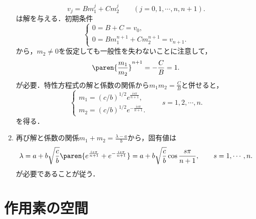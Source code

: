 \documentclass[uplatex, dvipdfmx]{jsreport}
\begin{document}
\begin{Proof}
\begin{enumerate}[{Step}1]
        \[v_j=Bm_1^j+Cm_2^j\qquad(j=0,1,\cdots,n,n+1).\]
        は解を与える．初期条件
        \[\begin{cases}
            0=B+C=v_0,\\
            0=Bm_1^{n+1}+Cm_2^{n+1}=v_{n+1}.
        \end{cases}\]
        から，$m_2\ne0$を仮定しても一般性を失わないことに注意して，
        \[\paren{\frac{m_1}{m_2}}^{n+1}=-\frac{C}{B}=1.\]
        が必要．特性方程式の解と係数の関係から$m_1m_2=\frac{C}{B}$と併せると，
        \[\begin{cases}
            m_1=(c/b)^{1/2}e^{\frac{is\pi}{n+1}},\\
            m_2=(c/b)^{1/2}e^{-\frac{is\pi}{n+1}}.
        \end{cases}\qquad s=1,2,\cdots,n.\]
        を得る．
        \item 再び解と係数の関係$m_1+m_2=\frac{\lambda-a}{b}$から，固有値は
        \[\lambda=a+b\sqrt{\frac{c}{b}}\paren{e^{\frac{is\pi}{n+1}}+e^{-\frac{is\pi}{n+1}}}=a+b\sqrt{\frac{c}{b}}\cos\frac{s\pi}{n+1},\qquad s=1,\cdots,n.\]
        が必要であることが従う．
    \end{enumerate}
\end{Proof}

\chapter{作用素の空間}
\end{document}

